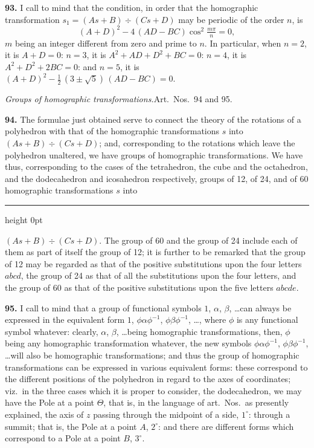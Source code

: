 \documentclass[11pt,a4paper]{article}
\newcommand{\artno}[1]{\textbf{#1.}\quad}
\begin{document}
\artno{93} I call to mind that the condition, in order that the homographic
transformation $s_{1} = (A s + B)\div(C s + D)$ may be periodic of the order
$n$, is
\[
  (A + D)^{2} - 4\,(A D - B C)\cos^{2}\tfrac{m\pi}{n} = 0,
\]
$m$ being an integer different from zero and prime to $n$. In particular,
when $n = 2$, it is $A + D = 0$: $n = 3$, it is $A^{2} + A D + D^{2} + B C = 0$:
$n = 4$, it is $A^{2} + D^{2} + 2 B C = 0$: and $n = 5$, it is
$(A + D)^{2} - \tfrac{1}{2}\,(3 \pm \sqrt{5})\,(A D - B C) = 0$.

\medskip
\begin{center}
\textit{Groups of homographic transformations.}\quad Art.\ Nos.\ 94 and 95.
\end{center}

\artno{94} The formulae just obtained serve to connect the theory of the
rotations of a polyhedron with that of the homographic transformations $s$
into $(A s + B)\div(C s + D)$; and, corresponding to the rotations which
leave the polyhedron unaltered, we have groups of homographic
transformations. We have thus, corresponding to the cases of the
tetrahedron, the cube and the octahedron, and the dodecahedron and
icosahedron respectively, groups of 12, of 24, and of 60 homographic
transformations $s$ into

\bigskip
\hrule height 0pt
\bigskip

\noindent
$(A s + B)\div(C s + D)$. The group of 60 and the group of 24 include each
of them as part of itself the group of 12; it is further to be remarked that
the group of 12 may be regarded as that of the positive substitutions upon
the four letters $abcd$, the group of 24 as that of all the substitutions
upon the four letters, and the group of 60 as that of the positive
substitutions upon the five letters $abcde$.

\artno{95} I call to mind that a group of functional symbols
$1$, $\alpha$, $\beta$, \ldots can always be expressed in the equivalent
form $1$, $\phi\alpha\phi^{-1}$, $\phi\beta\phi^{-1}$, \ldots, where $\phi$
is any functional symbol whatever: clearly, $\alpha$, $\beta$, \ldots being
homographic transformations, then, $\phi$ being any homographic
transformation whatever, the new symbols $\phi\alpha\phi^{-1}$,
$\phi\beta\phi^{-1}$, \ldots will also be homographic transformations; and
thus the group of homographic transformations can be expressed in various
equivalent forms: these correspond to the different positions of the
polyhedron in regard to the axes of coordinates; viz.\ in the three cases
which it is proper to consider, the dodecahedron, we may have the Pole at a
point $\Theta$, that is, in the language of art.\ Nos.\ as presently
explained, the axis of $z$ passing through the midpoint of a side, $1^{\circ}$:
through a summit; that is, the Pole at a point $A$, $2^{\circ}$: and there
are different forms which correspond to a Pole at a point $B$, $3^{\circ}$.
\end{document}
